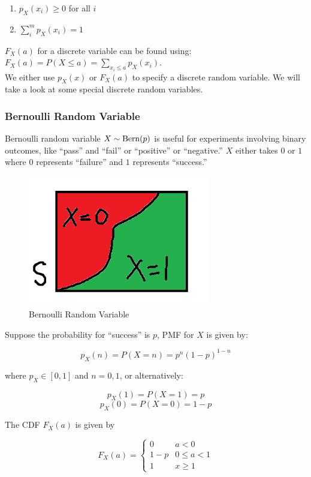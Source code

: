 \begin{enumerate}[i]
	\item $p_X (x_i) \ge 0$ for all $i$
	\item $\sum_i^m p_X (x_i)=1$
\end{enumerate}

$F_X(a)$ for a discrete variable can be found using: $F_X(a)=P(X\le a)=\sum_{x_i\le a} p_X(x_i)$. \\

We either use $p_X (x)$ or $F_X (a)$ to specify a discrete random variable. We will take a look at some special discrete random variables.

\subsubsection{Bernoulli Random Variable}

Bernoulli random variable $X \sim \operatorname{Bern} (p)$ is useful for experiments involving binary outcomes, like ``pass'' and ``fail'' or ``positive'' or ``negative.'' $X$ either takes $0$ or $1$ where $0$ represents ``failure'' and $1$ represents ``success.''

\begin{figure}[H]
	\centering
	\includegraphics[width=80mm]{5.png}
	\caption{Bernoulli Random Variable}
\end{figure}

Suppose the probability for ``success'' is $p$, PMF for $X$ is given by:

$$p_X(n)=P(X=n)=p^n(1-p)^{1-n}$$

where $p_X\in[0,1]$ and $n=0,1$, or alternatively:

$$p_X(1)=P(X=1)=p$$
$$p_X(0)=P(X=0)=1-p$$

The CDF $F_X(a)$ is given by

$$
F_X(a)=
\begin{cases} 
	0 & a<0 \\
	1-p & 0\le a<1 \\
	1 & x \ge 1
\end{cases}
$$

